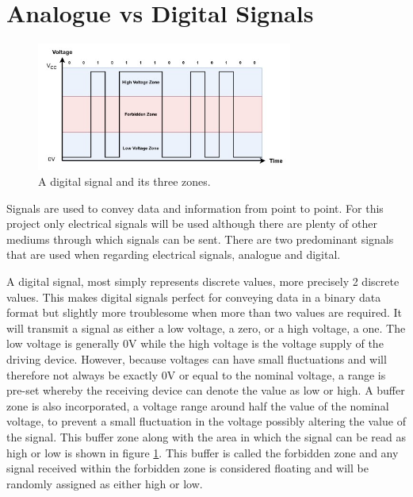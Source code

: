 \section{Analogue vs Digital Signals}
\begin{figure}
	\begin{center}
		\includegraphics[width = 0.75\textwidth]{figures/DigitalSignal.jpg}
		\caption{A digital signal and its three zones.}
		\label{fig:2:digital}
	\end{center}
\end{figure}
Signals are used to convey data and information from point to point. For this project only electrical signals will be used although there are plenty of other mediums through which signals can be sent. There are two predominant signals that are used when regarding electrical signals, analogue and digital. \par
\vspace{0.6cm}
A digital signal, most simply represents discrete values, more precisely 2 discrete values. This makes digital signals perfect for conveying data in a binary data format but slightly more troublesome when more than two values are required. It will transmit a signal as either a low voltage, a zero, or a high voltage, a one. The low voltage is generally 0V while the high voltage is the voltage supply of the driving device. However, because voltages can have small fluctuations and will therefore not always be exactly 0V or equal to the nominal voltage, a range is pre-set whereby the receiving device can denote the value as low or high. A buffer zone is also incorporated, a voltage range around half the value of the nominal voltage, to prevent a small fluctuation in the voltage possibly altering the value of the signal. This buffer zone along with the area in which the signal can be read as high or low is shown in figure \ref{fig:2:digital}. This buffer is called the forbidden zone and any signal received within the forbidden zone is considered floating and will be randomly assigned as either high or low.\par
